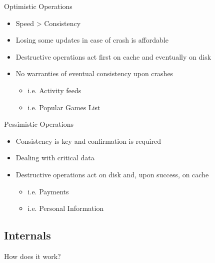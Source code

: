 \documentclass[aspectratio=169]{beamer}
\begin{document}
\begin{frame}{Optimistic Operations}
    \begin{itemize}
        \item Speed > Consistency
        \item Losing some updates in case of crash is affordable
        \item Destructive operations act first on cache and eventually on disk
        \item No warranties of eventual consistency upon crashes
            \begin{itemize}
                \item i.e. Activity feeds
                \item i.e. Popular Games List
            \end{itemize}
    \end{itemize}
\end{frame}

\begin{frame}{Pessimistic Operations}
    \begin{itemize}
        \item Consistency is key and confirmation is required
        \item Dealing with critical data
        \item Destructive operations act on disk and, upon success, on cache
            \begin{itemize}
                \item i.e. Payments
                \item i.e. Personal Information
            \end{itemize}
    \end{itemize}
\end{frame}

\subsection{Internals}
{
\begin{frame}{How does it work?}
\end{frame}
}
\end{document}
